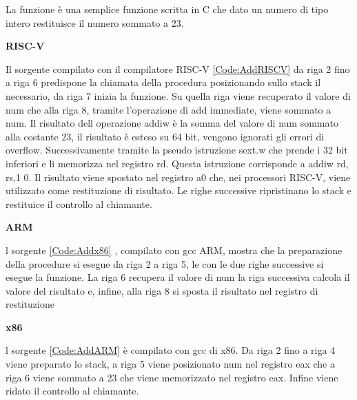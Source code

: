 \documentclass[12pt,a4paper]{report}
\begin{document}
La funzione è una semplice funzione scritta in C che dato un numero di tipo intero restituisce il numero sommato a 23. 

\vspace{0.3 cm}
\textbf{RISC-V}

\vspace{0.3 cm}
Il sorgente compilato con il compilatore RISC-V \ref{Code:AddRISCV} da riga 2 fino a riga 6 predispone la chiamata della procedura posizionando sullo stack il necessario, da riga 7 inizia la funzione. Su quella riga viene recuperato il valore di num che alla riga 8, tramite l'operazione di add immediate, viene sommato a num. Il risultato dell operazione addiw è la somma del valore di num sommato alla costante 23, il risultato è esteso su 64 bit, vengono ignorati gli errori di overflow. Successivamente tramite la pseudo istruzione sext.w che prende i 32 bit inferiori e li memorizza nel registro rd.  Questa istruzione corrisponde a addiw rd, rs,1 0. Il risultato viene spostato nel registro a0 che, nei processori RISC-V, viene utilizzato come restituzione di risultato. Le righe successive ripristinano lo stack e restituice il controllo al chiamante.

\vspace{0.3 cm}
\textbf{ARM}

\vspace{0.3 cm}

l sorgente  \ref{Code:Addx86} , compilato con gcc ARM, mostra che la preparazione della procedure si esegue da riga 2 a riga 5, le con le due righe successive si esegue la funzione. La riga 6 recupera il valore di num la riga successiva calcola il valore del risultato e, infine, alla riga 8 si sposta il risultato nel registro di restituzione


\vspace{0.3 cm}
\textbf{x86}

l sorgente  \ref{Code:AddARM} è compilato con gcc di x86.  Da riga 2 fino a riga 4 viene preparato lo stack, a riga 5 viene posizionato num nel registro eax che a riga 6 viene sommato a 23 che viene memorizzato nel registro eax. Infine viene ridato il controllo al chiamante.

\vspace{0.3 cm}
\end{document}
